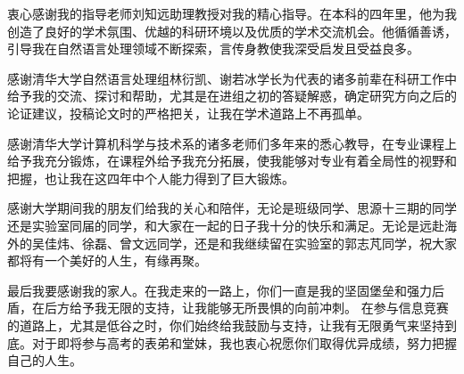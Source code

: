 \begin{acknowledgement}

衷心感谢我的指导老师刘知远助理教授对我的精心指导。在本科的四年里，他为我创造了良好的学术氛围、优越的科研环境以及优质的学术交流机会。他循循善诱，引导我在自然语言处理领域不断探索，言传身教使我深受启发且受益良多。

感谢清华大学自然语言处理组林衍凯、谢若冰学长为代表的诸多前辈在科研工作中给予我的交流、探讨和帮助，尤其是在进组之初的答疑解惑，确定研究方向之后的论证建议，投稿论文时的严格把关，让我在学术道路上不再孤单。

感谢清华大学计算机科学与技术系的诸多老师们多年来的悉心教导，在专业课程上给予我充分锻炼，在课程外给予我充分拓展，使我能够对专业有着全局性的视野和把握，也让我在这四年中个人能力得到了巨大锻炼。

感谢大学期间我的朋友们给我的关心和陪伴，无论是班级同学、思源十三期的同学还是实验室同届的同学，和大家在一起的日子我十分的快乐和满足。无论是远赴海外的吴佳炜、徐磊、曾文远同学，还是和我继续留在实验室的郭志芃同学，祝大家都将有一个美好的人生，有缘再聚。

最后我要感谢我的家人。在我走来的一路上，你们一直是我的坚固堡垒和强力后盾，在后方给予我无限的支持，让我能够无所畏惧的向前冲刺。
在参与信息竞赛的道路上，尤其是低谷之时，你们始终给我鼓励与支持，让我有无限勇气来坚持到底。对于即将参与高考的表弟和堂妹，我也衷心祝愿你们取得优异成绩，努力把握自己的人生。

\end{acknowledgement}
